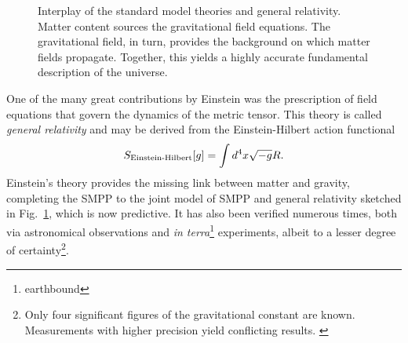 \begin{figure}
  \begin{center}
  \end{center}
  \caption[Interplay of the standard model theories and general relativity]{Interplay of the standard model theories and general relativity. Matter content sources the gravitational field equations. The gravitational field, in turn, provides the background on which matter fields propagate. Together, this yields a highly accurate fundamental description of the universe.}
  \label{figure_smpp_gr}
\end{figure}

One of the many great contributions by Einstein was the prescription of field equations that govern the dynamics of the metric tensor. \cite{Einstein_1916} This theory is called \emph{general relativity} and may be derived from the Einstein-Hilbert action functional
\begin{equation*}
  S_\text{Einstein-Hilbert}\lbrack g\rbrack = \int\mathrm \mathrm d^4x \sqrt{-g} R.
\end{equation*}
Einstein's theory provides the missing link between matter and gravity, completing the SMPP to the joint model of SMPP and general relativity sketched in Fig.~\ref{figure_smpp_gr}, which is now predictive. It has also been verified numerous times, both via astronomical observations and \emph{in terra}\footnote{earthbound} experiments, albeit to a lesser degree of certainty\footnote{Only four significant figures of the gravitational constant are known. \cite{Mohr_2016} Measurements with higher precision yield conflicting results. \cite{Mohr_2012}}.

